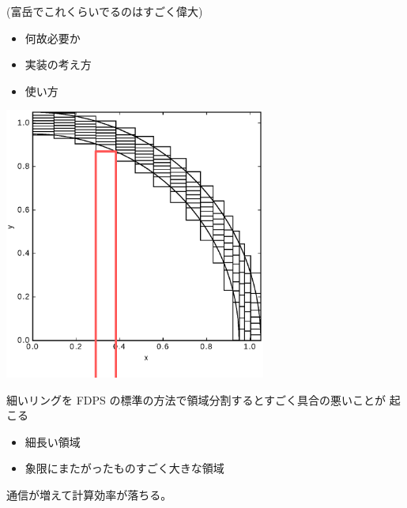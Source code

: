\documentclass[12pt,dvipdfmx]{article}
\begin{document}
(富岳でこれくらいでるのはすごく偉大)



\begin{itemize}

\item 何故必要か

\item 実装の考え方

\item 使い方

\end{itemize}

\begin{minipage}[b]{9cm}
\begin{center}
\includegraphics[width=8.6cm]{domain_cart.eps}
\end{center}
\end{minipage}
\begin{minipage}[b]{6cm}
\raggedright

細いリングを FDPS の標準の方法で領域分割するとすごく具合の悪いことが
起こる


\begin{itemize}

\item 細長い領域

\item 象限にまたがったものすごく大きな領域

\end{itemize}

通信が増えて計算効率が落ちる。

\end{minipage}

\end{document}
